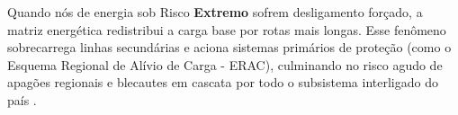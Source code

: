 Quando nós de energia sob Risco \textbf{Extremo} sofrem desligamento forçado, a matriz energética redistribui a carga base por rotas mais longas. Esse fenômeno sobrecarrega linhas secundárias e aciona sistemas primários de proteção (como o Esquema Regional de Alívio de Carga - ERAC), culminando no risco agudo de apagões regionais e blecautes em cascata por todo o subsistema interligado do país \cite{ons_procedimentos_2026}.


